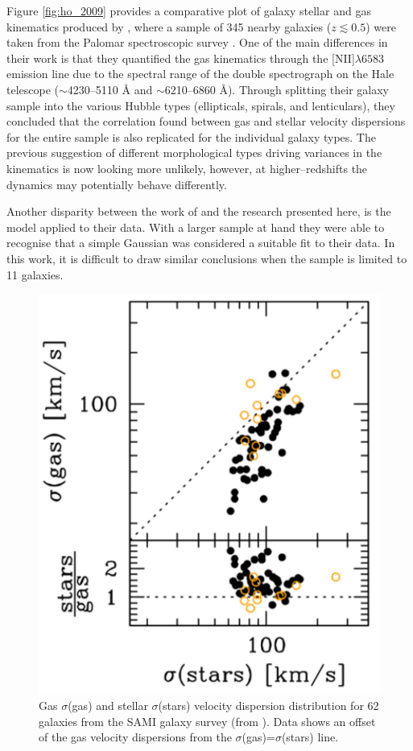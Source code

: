 \documentclass[12pt, twocolumn, nofootinbib]{revtex4-1}    %
\begin{document}
Figure \ref{fig:ho_2009} provides a comparative plot of galaxy stellar and gas kinematics produced by \cite{2009ApJ...699..638H}, where a sample of 345 nearby galaxies ($z\lesssim0.5$) were taken from the Palomar spectroscopic survey \citep{1995ApJS...98..477H, 1997ApJS..112..315H}. One of the main differences in their work is that they quantified the gas kinematics through the [NII]$\lambda6583$ emission line due to the spectral range of the double spectrograph on the Hale telescope ($\sim$4230--5110 {\AA} and $\sim$6210--6860 {\AA}). Through splitting their galaxy sample into the various Hubble types (ellipticals, spirals, and lenticulars), they concluded that the correlation found between gas and stellar velocity dispersions for the entire sample is also replicated for the individual galaxy types. The previous suggestion of different morphological types driving variances in the kinematics is now looking more unlikely, however, at higher--redshifts the dynamics may potentially behave differently. 

Another disparity between the work of \cite{2009ApJ...699..638H} and the research presented here, is the model applied to their data. With a larger sample at hand they were able to recognise that a simple Gaussian was considered a suitable fit to their data. In this work, it is difficult to draw similar conclusions when the sample is limited to 11 galaxies. 

\begin{figure}
\includegraphics[width=0.6\linewidth]{data/cortese_2010.pdf}
\caption{Gas $\sigma$(gas) and stellar $\sigma$(stars) velocity dispersion distribution for 62 galaxies from the SAMI galaxy survey (from \cite{2014ApJ...795L..37C}). Data shows an offset of the gas velocity dispersions from the $\sigma$(gas)=$\sigma$(stars) line.}
\label{fig:cortese_2010}
\end{figure} 
\end{document}
